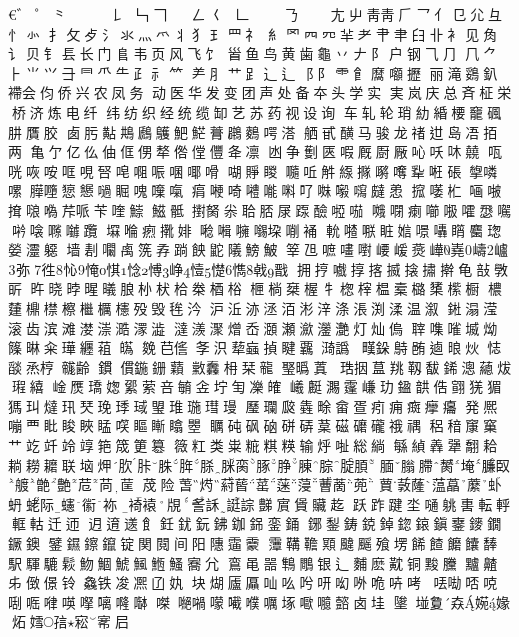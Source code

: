€゛゜⺀㇀㇁㇂㇃㇄𠄌㇅𠃑𠃍
㇆㇇𠃋𡿨㇈𠃊㇉㇊㇋㇌𠄎㇍㇎
𡯁屮⾭靑𠂆乛亻㔾尣彑忄㣺
扌攵歺氵氺灬爫丬犭𤣩罒礻
糹罓𦉪㓁𦍋耂肀𦘒𦥑卝衤见𧢲
讠贝钅镸长门𨸏韦页风飞饣
𩠐鱼鸟黄歯龜丷𠂇阝户钢⺄⺆
⺇⺈⺊⺌⺍⺕⺜⺥⺧⺪⺬⺮
⺶⺼⺾⻊⻌⻍⻏⻖⻗⻞𪎩𡅅攊
丽滝鵎釟𧜵会伨侨兴农凤务
动医华发变团声处备夲头学实
実岚庆总斉柾栄桥济炼电纤
纬纺织经统缆缷艺苏药视设询
车轧轮琑糼緍楆竉碸肼贋胶
𠧧肟黇䳍鷉鸌䰾𩷶𧀎鸊𪄳㗁溚
舾甙䤑马骏龙禇𨑬𡷊𠗐𢫦两
亀亇亿仫伷㑌侽㹈倃㑽㒥夅凛
凼争劐匧㗇厩㕑厰吣㕭㕲㚁
咓咣咴咹哐哯唘唣唨㖘㖥㖿嗗
㗅𧶄䁓𡃴𠰋𧣈𦂥𢵌𡁷𡁯𢆡𠶖
䂻𢳉噒𠼱𦠜𡃏𢠃𢤹㗻𥇣𠺌𠾍𠺪
㾓𠼰𠵇𡅏𠹌𠺫𠮩𠵈𡃀𡄽㿹𢚖
搲𠾭𣏴𠵾𠵿𢱕𠺘𠼮𦭐哌苄喹𩻃
鰦骶𢷮胬尜𦕲脴㞗𨂽醶𠻺𠸏
𠹷𠻻𤷫㘉𠳖嚯𢞵𡃉𠸐𠹸𡁸𡅈𨈇
𡑕𠹹𤹐𢶤婔𡀝𡀞𡃵𡃶垜𠸑𧚔
𨋍𠾵𠹻𥅾㜃𠾶𡆀𥋘𪊽𤧚𡠺𤅷𨉼
墙剨㘚𥜽箲孨䠀䬬鼧䧧鰟鮍
𥭴𣄽嗻㗲嚉崾嵈㷼㠏嶤嶹㠠弥
徃㤈㤿㥍惗愽峥㦉憷懏㦸戬
拥㧸嚱㨃揢揻搇㩋擀龟㪗斆㪽
旿晓㫲暒㬢朖㭂枤㭘桊梄㭲
㭱㭻椉楃牜楤榟榅槖㯝橥橴橱
檂㯬檙㯲檫檵櫔櫶殁毁毪汵
沪㳋洂洆洦涁㳯涤涱渕渘温溆
𨧀溻滢滚齿滨滩漤漴㵆𣽁澁
澾㵪㵵熷岙㶊瀬㶑灐灔灯灿𠌥
䏁㗱𠻘㙎㶭𥱥晽籴璍纒䔃𤾸
𠬍𦬊㑾𢻯𣲵𦺙蝱揁睷覊𣾏譌
𤳉䤪𪀔𨚼𨔁㫰炏𢙺𦦨𤉋梈𢅛齢
鏆𠍿鍦銏蘔𪑛䆐枏栞㡣𤧬㬙蒖
𤥢㧢蒀䍮靱馛䤭漗𧄉炦𤩏繥
崯㷳𤩝𡟟綤萦咅𣫺𠈔坾𠣕𠘙㿥
𡾞𪊶瀃𩅛嵰玏𨩙𩐠俈翧猐猸
獁㺩燵𤣲珡㻊㻑琙琞琟㻢㻰㻴
㻺瓓㼎㽓畭畲疍㽼痈癍癴㿜
発熈嘣覀䀝睃䀹䁅㗛瞘䁪䁯瞾
矋砘砜硇硑硦葈𥔵礳礲䄉禑
稆䅧䆲窼艹䇄竏竛䇏筢筬筻簒
䉠䉺类粜䊌粸䊔输烀𠳏総緔
緐緽羴犟䎗耠耥耮耱联垴炠肷
胩䏭脌脎脒脔䐁㬹腖腙腚䐓
腼䐥䐭膥埯臁臤艔䒏艶苊苘䒰
荗险萅烵葤蒈䔄蒾蓡蓸蔐蔸
蕒䔻蕯蕰藠䕷虲蚒蛯际䘆䘗袮
裿褤覑𧥧訸誔誴豑賔賲贜䞘
跃䟭踺坔嗵䠷軎転軤軭軲迁迊
迌逳䢭飠鈓䤞鈨鉘鉫銱銮銿
鋣鋫鋳鋴鋽鍃鎄鎭䥅䥑鐗鐝鐭
鐾䥪鑔鑹锭関䦧间阳䧥䨤靀
䨵鞲韂䫤颹䬙飱塄餙餷饝饢䭰
駅䮝騼鬏魩鯝鯱鯴䱭鰠㝯𡯂
鵉黾噐鶽鷼银辶麱麽黆铜黢黱
黸齄𠂔𠊷𠎠铃𠓗铁𠗕𠘕𠙶𡚺
块煳𠫂𠫍𠮿吆𠯋咞𠯻𠰻𠱓𠱥𠱼
𠲍𠲵𠳝𠳭𠵯𠶲𠷈𠸄𠸎𠻗𠾐𠼭
𠹳𠾼𡁜𡁏𡁶𡂈𡂖㙇𡂿𡄯𡄻卤𡋣
𡍵𡌶𡕷𡘙𡟃𡟇炻𡠭𡥪𡨭𡩅𡰪

